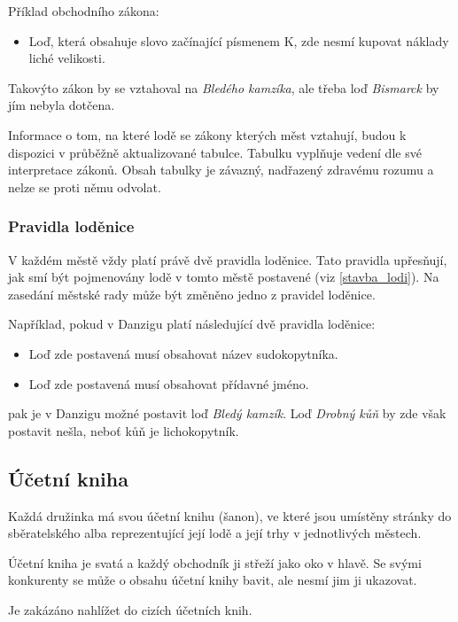\documentclass[a4paper, 12pt, twoside]{article}
\begin{document}
Příklad obchodního zákona:

\begin{itemize}
    \item Loď, která obsahuje slovo začínající písmenem K, zde nesmí kupovat náklady liché velikosti.
\end{itemize}

Takovýto zákon by se vztahoval na \emph{Bledého kamzíka}, ale třeba loď \emph{Bismarck} by jím nebyla dotčena.

Informace o tom, na které lodě se zákony kterých měst vztahují, budou k dispozici v průběžně aktualizované tabulce.  Tabulku vyplňuje vedení 
dle své interpretace zákonů.  Obsah tabulky je závazný, nadřazený zdravému rozumu a nelze se proti němu odvolat.

\subsubsection{Pravidla loděnice}

V každém městě vždy platí právě dvě pravidla loděnice.  Tato pravidla upřesňují, jak smí být pojmenovány 
lodě v tomto městě postavené (viz \ref{stavba_lodi}).
Na zasedání městské rady může být změněno jedno z pravidel loděnice.

Například, pokud v Danzigu platí následující dvě pravidla loděnice:

\begin{itemize}
    \item Loď zde postavená musí obsahovat název sudokopytníka.
    \item Loď zde postavená musí obsahovat přídavné jméno.
\end{itemize}

pak je v Danzigu možné postavit loď \emph{Bledý kamzík}.  Loď \emph{Drobný kůň} by zde však postavit nešla, neboť kůň je lichokopytník.

\subsection{Účetní kniha}

Každá družinka má svou účetní knihu (šanon), ve které jsou umístěny stránky do sběratelského alba reprezentující její lodě a její trhy v jednotlivých městech.

Účetní kniha je svatá a každý obchodník ji střeží jako oko v hlavě.  Se svými konkurenty se může o obsahu účetní knihy bavit, ale nesmí jim ji ukazovat.  

Je zakázáno nahlížet do cizích účetních knih.
\end{document}
